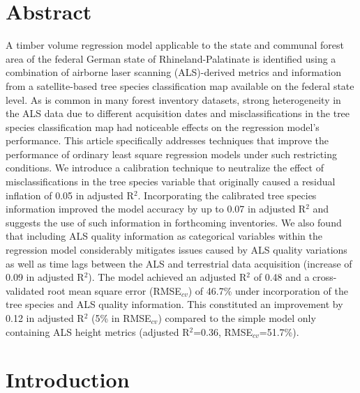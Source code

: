 \section*{Abstract}
\label{chap:regmod:Abstract}
A timber volume regression model applicable to the state and communal forest area of the federal German state of Rhineland-Palatinate is identified using a combination of airborne laser scanning (ALS)-derived metrics and information from a satellite-based tree species classification map available on the federal state level. As is common in many forest inventory datasets, strong heterogeneity in the ALS data due to different acquisition dates and misclassifications in the tree species classification map had noticeable effects on the regression model's performance. This article specifically addresses techniques that improve the performance of ordinary least square regression models under such restricting conditions. We introduce a calibration technique to neutralize the effect of misclassifications in the tree species variable that originally caused a residual inflation of 0.05 in adjusted R$^2$. Incorporating the calibrated tree species information improved the model accuracy by up to 0.07 in adjusted R$^2$ and suggests the use of such information in forthcoming inventories. We also found that including ALS quality information as categorical variables within the regression model considerably mitigates issues caused by ALS quality variations as well as time lags between the ALS and terrestrial data acquisition (increase of 0.09 in adjusted R$^2$). The model achieved an adjusted R$^2$ of 0.48 and a cross-validated root mean square error (RMSE$_{cv}$) of 46.7\% under incorporation of the tree species and ALS quality information. This constituted an improvement by 0.12 in adjusted R$^2$ (5\% in RMSE$_{cv}$) compared to the simple model only containing ALS height metrics (adjusted R$^2$=0.36, RMSE$_{cv}$=51.7\%).



\section{Introduction}
\label{sec:regmod:intro}

